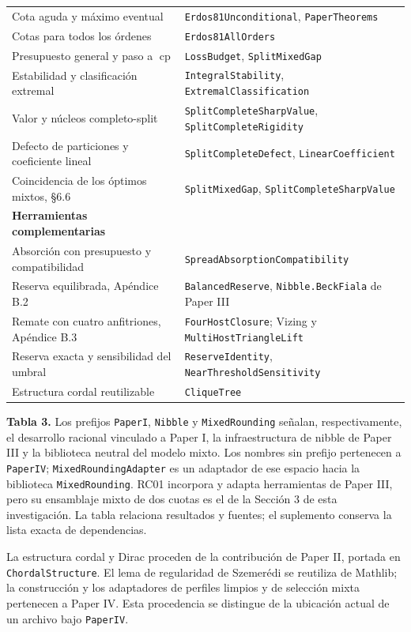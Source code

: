 \documentclass[spanish,11pt,a4paper]{article}
\begin{document}
{\begin{longtable}[c]{@{}
  >{\raggedright\arraybackslash}p{}
  >{\raggedright\arraybackslash}p{}@{}}
Cota aguda y máximo eventual & \nolinkurl{Erdos81Unconditional}, \nolinkurl{PaperTheorems} \\
Cotas para todos los órdenes & \nolinkurl{Erdos81AllOrders} \\
Presupuesto general y paso a \(\operatorname{cp}\) & \nolinkurl{LossBudget}, \nolinkurl{SplitMixedGap} \\
Estabilidad y clasificación extremal & \nolinkurl{IntegralStability}, \nolinkurl{ExtremalClassification} \\
Valor y núcleos completo-split & \nolinkurl{SplitCompleteSharpValue}, \nolinkurl{SplitCompleteRigidity} \\
Defecto de particiones y coeficiente lineal & \nolinkurl{SplitCompleteDefect}, \nolinkurl{LinearCoefficient} \\
Coincidencia de los óptimos mixtos, §6.6 & \nolinkurl{SplitMixedGap}, \nolinkurl{SplitCompleteSharpValue} \\
\textbf{Herramientas complementarias} & \\
Absorción con presupuesto y compatibilidad & \nolinkurl{SpreadAbsorptionCompatibility} \\
Reserva equilibrada, Apéndice B.2 & \nolinkurl{BalancedReserve}, \nolinkurl{Nibble.BeckFiala} de Paper III \\
Remate con cuatro anfitriones, Apéndice B.3 & \nolinkurl{FourHostClosure}; Vizing y \nolinkurl{MultiHostTriangleLift} \\
Reserva exacta y sensibilidad del umbral & \nolinkurl{ReserveIdentity}, \nolinkurl{NearThresholdSensitivity} \\
Estructura cordal reutilizable & \nolinkurl{CliqueTree} \\
\end{longtable}
}

\textbf{Tabla 3.} Los prefijos \nolinkurl{PaperI}, \nolinkurl{Nibble} y \nolinkurl{MixedRounding} señalan, respectivamente, el desarrollo racional vinculado a Paper I, la infraestructura de nibble de Paper III y la biblioteca neutral del modelo mixto. Los nombres sin prefijo pertenecen a \nolinkurl{PaperIV}; \nolinkurl{MixedRoundingAdapter} es un adaptador de ese espacio hacia la biblioteca \nolinkurl{MixedRounding}. RC01 incorpora y adapta herramientas de Paper III, pero su ensamblaje mixto de dos cuotas es el de la Sección 3 de esta investigación. La tabla relaciona resultados y fuentes; el suplemento conserva la lista exacta de dependencias.

La estructura cordal y Dirac proceden de la contribución de Paper II, portada en \nolinkurl{ChordalStructure}. El lema de regularidad de Szemerédi se reutiliza de Mathlib; la construcción y los adaptadores de perfiles limpios y de selección mixta pertenecen a Paper IV. Esta procedencia se distingue de la ubicación actual de un archivo bajo \nolinkurl{PaperIV}.
\end{document}
